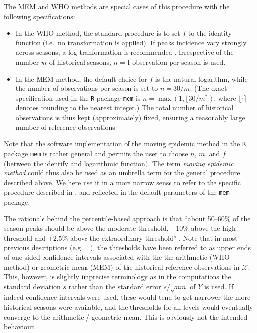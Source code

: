 \documentclass{article}
\newcommand{\sd}{s}
\newcommand{\mean}{\bar{Y}}
\begin{document}
\noindent The MEM and WHO methods are special cases of this procedure with the following specifications:
\begin{itemize}
\item In the WHO method, the standard procedure is to set $f$ to the identity function (i.e.\ no transformation is applied). If peaks incidence vary strongly across seasons, a log-tranformation is recommended \citep{WHO2017}. Irrespective of the number $m$ of historical seasons, $n = 1$ observation per season is used.
\item In the MEM method, the default choice for $f$ is the natural logarithm, while the number of observations per season is set to $n = 30/m$. (The exact specification used in the \texttt{R} package \texttt{mem} is $n = \max(1, \lfloor 30/m \rceil)$, where $\lfloor \cdot \rceil$ denotes rounding to the nearest integer.) The total number of historical observations is thus kept (approximately) fixed, ensuring a reasonably large number of reference observations
\end{itemize}
Note that the software implementation of the moving epidemic method in the \texttt{R} package \texttt{mem} is rather general and permits the user to choose $n$, $m$, and $f$ (between the identify and logarithmic function). The term \textit{moving epidemic method} could thus also be used as an umbrella term for the general procedure described above. We here use it in a more narrow sense to refer to the specific procedure described in \cite{Vega2015}, \cite{WHO2017} and reflected in the default parameters of the \texttt{mem} package.

The rationale behind the percentile-based approach is that ``about 50--60\% of the season peaks should be above the moderate threshold, $\pm 10\%$ above the high threshold and $\pm 2.5\%$ above the extraordinary threshold'' \citep{WHO2017}. Note that in most previous descriptions (e.g., \ \citealt{WHO2014, Vega2015}), the thresholds have been referred to as upper ends of one-sided confidence intervals associated with the the arithmetic (WHO method) or geometric mean (MEM) of the historical reference observations in $\mathcal{X}$. This, however, is slightly imprecise terminology as in the computations the standard deviation $\sd$ rather than the standard error $\sd/\sqrt{nm}$ of $\mean$ is used. If indeed confidence intervals were used, these would tend to get narrower the more historical seasons were available, and the thresholds for all levels would eventually converge to the arithmetic / geometric mean. This is obviously not the intended behaviour.
\end{document}
